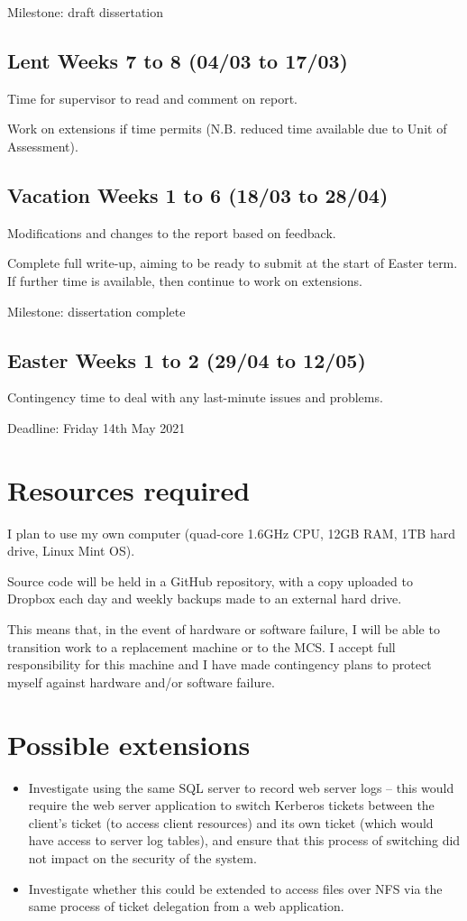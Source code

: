 \documentclass{article}
\begin{document}
Milestone: draft dissertation

\subsection*{Lent Weeks 7 to 8 (04/03 to 17/03)}
Time for supervisor to read and comment on report.

Work on extensions if time permits (N.B. reduced time available due to Unit of Assessment).

\subsection*{Vacation Weeks 1 to 6 (18/03 to 28/04)}
Modifications and changes to the report based on feedback.

Complete full write-up, aiming to be ready to submit at the start of Easter term. If further time is available, then continue to work on extensions.

Milestone: dissertation complete

\subsection*{Easter Weeks 1 to 2 (29/04 to 12/05)}
Contingency time to deal with any last-minute issues and problems.

Deadline: Friday 14th May 2021

\section*{Resources required}
I plan to use my own computer (quad-core 1.6GHz CPU, 12GB RAM, 1TB hard drive, Linux Mint OS).

Source code will be held in a GitHub repository, with a copy uploaded to Dropbox each day and weekly backups made to an external hard drive.

This means that, in the event of hardware or software failure, I will be able to transition work to a replacement machine or to the MCS. I accept full responsibility for this machine and I have made contingency plans to protect myself against hardware and/or software failure.

\section*{Possible extensions}
\begin{itemize}
\item Investigate using the same SQL server to record web server logs -- this would require the web server application to switch Kerberos tickets between the client's ticket (to access client resources) and its own ticket (which would have access to server log tables), and ensure that this process of switching did not impact on the security of the system.
\item Investigate whether this could be extended to access files over NFS via the same process of ticket delegation from a web application.
\end{itemize}
\end{document}
